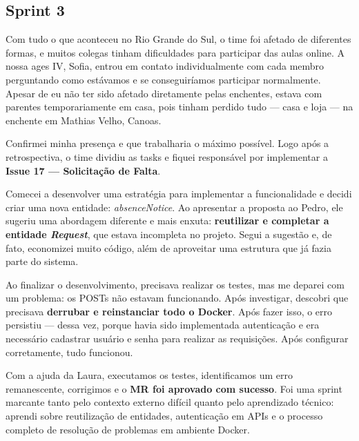 \subsection{Sprint 3}

Com tudo o que aconteceu no Rio Grande do Sul, o time foi afetado de diferentes
formas, e muitos colegas tinham dificuldades para participar das aulas online. A nossa
\ac{ages} IV, Sofia, entrou em contato individualmente com cada membro perguntando
como estávamos e se conseguiríamos participar normalmente. Apesar de eu não ter sido
afetado diretamente pelas enchentes, estava com parentes temporariamente em casa,
pois tinham perdido tudo --- casa e loja --- na enchente em Mathias Velho, Canoas.

Confirmei minha presença e que trabalharia o máximo possível. Logo após a
retrospectiva, o time dividiu as tasks e fiquei responsável por implementar a
\textbf{Issue 17 --- Solicitação de Falta}.

Comecei a desenvolver uma estratégia para implementar a funcionalidade e decidi criar
uma nova entidade: \textit{absenceNotice}. Ao apresentar a proposta ao Pedro, ele
sugeriu uma abordagem diferente e mais enxuta: \textbf{reutilizar e completar a
entidade \textit{Request}}, que estava incompleta no projeto. Segui a sugestão e,
de fato, economizei muito código, além de aproveitar uma estrutura que já fazia parte
do sistema.

Ao finalizar o desenvolvimento, precisava realizar os testes, mas me deparei com um
problema: os POSTs não estavam funcionando. Após investigar, descobri que precisava
\textbf{derrubar e reinstanciar todo o Docker}. Após fazer isso, o erro persistiu ---
dessa vez, porque havia sido implementada autenticação e era necessário cadastrar
usuário e senha para realizar as requisições. Após configurar corretamente, tudo
funcionou.

Com a ajuda da Laura, executamos os testes, identificamos um erro remanescente,
corrigimos e o \textbf{MR foi aprovado com sucesso}. Foi uma sprint marcante tanto
pelo contexto externo difícil quanto pelo aprendizado técnico: aprendi sobre
reutilização de entidades, autenticação em APIs e o processo completo de resolução
de problemas em ambiente Docker.

